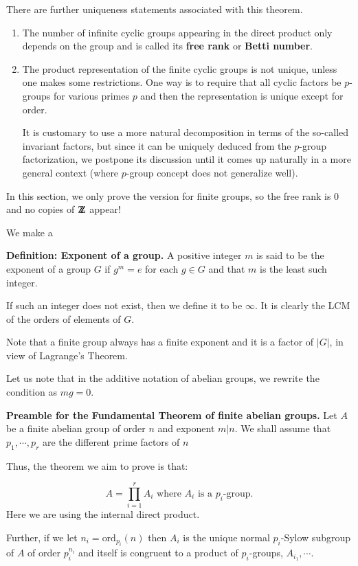 \documentclass[12pt]{article}
\newcommand{\deff}[1]{{\bf Definition: #1} }
\def\DZ{ \mbox{\rm Z \kern -0.75em Z} }
\newcommand{\ord}{\mbox{ord}}
\begin{document}
There are further uniqueness statements associated with this theorem.
\begin{enumerate}
\item The number of infinite cyclic groups appearing in the direct
product only depends on the group and is called its {\bf free rank} or
{\bf Betti number}.
\item The product representation of the finite cyclic groups is not
unique, unless one makes some restrictions. One way is to require that
all cyclic factors be $p$-groups for various primes $p$ and then the
representation is unique except for order.

It is customary to use a more natural decomposition in terms of the
so-called invariant factors, but since it can be uniquely deduced from
the $p$-group factorization, we postpone its discussion until it comes
up naturally in a more general context (where $p$-group concept does not
generalize well).

\end{enumerate}

In this section, we only prove the version for finite groups, so the
free rank is $0$ and no copies of $\DZ$ appear!

We make a

\deff{Exponent of a group.} A positive integer $m$ is said to be the
exponent of a group $G$ if $g^m=e$ for each $g\in G$ and that $m$
is the least such integer.

If such an integer does not exist, then we define it to be $\infty$.
It is clearly the LCM of the orders of elements of $G$.

Note that a finite group always has a finite exponent and it is a factor of
$|G|$, in view of Lagrange's Theorem.

Let us note that in the additive notation of abelian groups, we rewrite
the condition as $mg=0$.

{\bf Preamble for the Fundamental Theorem of finite abelian groups.}
Let $A$ be a finite abelian group of order $n$ and exponent $m |n$.
We shall assume that $p_1,\cdots,p_r$ are the different prime factors of
$n$

Thus, the theorem we aim  to prove is that:

$$A = \prod_{i=1}^r A_i \mbox{ where $A_i$ is a $p_i$-group.}$$
Here we are using the internal direct product.

Further, if we let $n_i=\ord_{p_i}(n)$ then $A_i$ is the unique normal
$p_i$-Sylow subgroup of $A$ of order $p_i^{n_i}$ and itself is congruent
to a product of $p_i$-groups, $A_{i_1},\cdots$.
\end{document}
